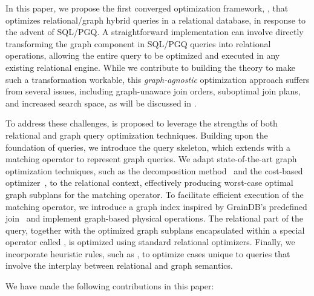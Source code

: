 In this paper, we propose the first converged optimization framework, \name, that optimizes relational/graph hybrid queries in a relational database, in response to the advent of SQL/PGQ. A straightforward implementation can involve directly transforming the graph component in SQL/PGQ queries into relational operations, allowing the entire query to be optimized and executed in any existing relational engine. While we contribute to building the theory to make such a transformation workable, this \emph{graph-agnostic} optimization approach suffers from several issues, including graph-unaware join orders, suboptimal join plans, and increased search space, as will be discussed in .

To address these challenges, \name is proposed to leverage the strengths of both relational and graph query optimization techniques. Building upon the foundation of \spj queries, we introduce the \spjm query skeleton, which extends \spj with a matching operator to represent graph queries. We adapt state-of-the-art graph optimization techniques, such as the decomposition method~\cite{huge} and the cost-based optimizer~\cite{GLogS}, to the relational context, effectively producing worst-case optimal graph subplans for the matching operator. To facilitate efficient execution of the matching operator, we introduce a graph index inspired by GrainDB's predefined join~\cite{graindb} and implement graph-based physical operations. The relational part of the query, together with the optimized graph subplans encapsulated within a special operator called \scangraphtable, is optimized using standard relational optimizers. Finally, we incorporate heuristic rules, such as \filterrule, to optimize cases unique to \spjm queries that involve the interplay between relational and graph semantics.

We have made the following contributions in this paper:


